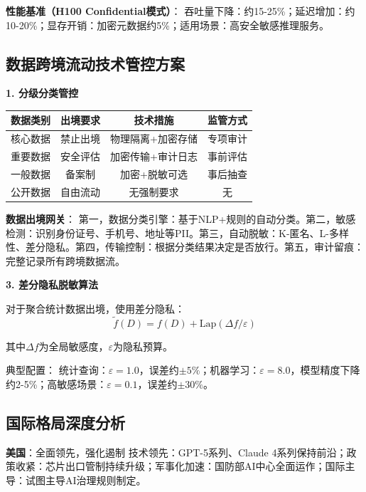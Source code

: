 \textbf{性能基准（H100 Confidential模式）}：
吞吐量下降：约15-25\%；延迟增加：约10-20\%；显存开销：加密元数据约5\%；适用场景：高安全敏感推理服务。

\subsection{数据跨境流动技术管控方案}

\textbf{1. 分级分类管控}

\begin{table}[H]
\centering
\small
\begin{tabular}{lccc}
\toprule
\textbf{数据类别} & \textbf{出境要求} & \textbf{技术措施} & \textbf{监管方式} \\
\midrule
核心数据 & 禁止出境 & 物理隔离+加密存储 & 专项审计 \\
重要数据 & 安全评估 & 加密传输+审计日志 & 事前评估 \\
一般数据 & 备案制 & 加密+脱敏可选 & 事后抽查 \\
公开数据 & 自由流动 & 无强制要求 & 无 \\
\bottomrule
\end{tabular}
\end{table}

\textbf{数据出境网关}：
第一，数据分类引擎：基于NLP+规则的自动分类。第二，敏感检测：识别身份证号、手机号、地址等PII。第三，自动脱敏：K-匿名、L-多样性、差分隐私。第四，传输控制：根据分类结果决定是否放行。第五，审计留痕：完整记录所有跨境数据流。

\textbf{3. 差分隐私脱敏算法}

对于聚合统计数据出境，使用差分隐私：
\begin{equation}
\tilde{f}(D) = f(D) + \text{Lap}(\Delta f / \varepsilon)
\end{equation}

其中$\Delta f$为全局敏感度，$\varepsilon$为隐私预算。

典型配置：
统计查询：$\varepsilon=1.0$，误差约$\pm 5\%$；机器学习：$\varepsilon=8.0$，模型精度下降约2-5\%；高敏感场景：$\varepsilon=0.1$，误差约$\pm 30\%$。

\subsection{国际格局深度分析}

\textbf{美国}：全面领先，强化遏制
技术领先：GPT-5系列、Claude 4系列保持前沿；政策收紧：芯片出口管制持续升级；军事化加速：国防部AI中心全面运作；国际主导：试图主导AI治理规则制定。

